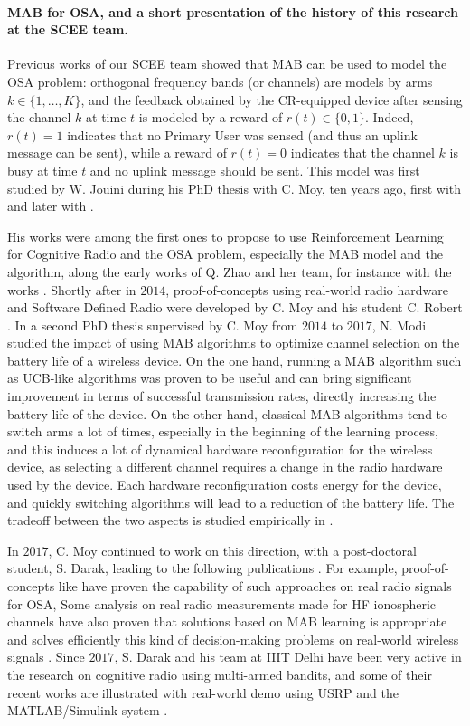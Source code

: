 \paragraph{MAB for OSA, and a short presentation of the history of this research at the SCEE team.}
%
Previous works of our SCEE team showed that MAB can be used to model the OSA problem:
orthogonal frequency bands (or channels) are models by arms $k\in\{1,\dots,K\}$,
and the feedback obtained by the CR-equipped device after sensing the channel $k$ at time $t$ is modeled by a reward of $r(t) \in \{0,1\}$.
Indeed, $r(t) = 1$ indicates that no Primary User was sensed (and thus an uplink message can be sent), while a reward of $r(t)=0$ indicates that the channel $k$ is busy at time $t$ and no uplink message should be sent.
%
This model was first studied by W. Jouini during his PhD thesis with C. Moy, ten years ago, first with \cite{Jouini09} and later with \cite{Jouini10,Jouini12}.

His works were among the first ones to propose to use Reinforcement Learning for Cognitive Radio and the OSA problem, especially the MAB model and the \UCB{} algorithm,
along the early works of Q. Zhao and her team, for instance with the works \cite{Liu08,Zhao10}.
%
Shortly after in $2014$, proof-of-concepts using real-world radio hardware and Software Defined Radio were developed by C. Moy and his student C. Robert \cite{RobertSDR2014,MoyWSR2014}.
In a second PhD thesis supervised by C. Moy \cite{Modi17PhD} from $2014$ to $2017$, N. Modi studied the impact of using MAB algorithms to optimize channel selection on the battery life of a wireless device.
On the one hand, running a MAB algorithm such as UCB-like algorithms was proven to be useful and can bring significant improvement in terms of successful transmission rates, directly increasing the battery life of the device.
On the other hand, classical MAB algorithms tend to switch arms a lot of times, especially in the beginning of the learning process, and this induces a lot of dynamical hardware reconfiguration for the wireless device, as selecting a different channel requires a change in the radio hardware used by the device.
Each hardware reconfiguration costs energy for the device, and quickly switching algorithms will lead to a reduction of the battery life.
The tradeoff between the two aspects is studied empirically in
\cite{modiDemo2016}.

In $2017$, C. Moy continued to work on this direction, with a post-doctoral student, S. Darak, leading to the following publications
\cite{darak2016bayesian,Darak16,modiDemo2016,kumar2016two}.
%
For example, proof-of-concepts like \cite{kumar2016two} have proven the capability of such approaches on real radio signals for OSA,
%
Some analysis on real radio measurements made for HF ionospheric channels have also proven that solutions based on MAB learning is appropriate and solves efficiently this kind of decision-making problems on real-world wireless signals \cite{Melian15}.
%
Since $2017$, S. Darak and his team at IIIT Delhi have been very active in the research on cognitive radio using multi-armed bandits, and some of their recent works are illustrated with real-world demo using USRP and the MATLAB/Simulink system
\cite{KumarYadav2018,SawantKumar2018,JoshiKumar2018}.

